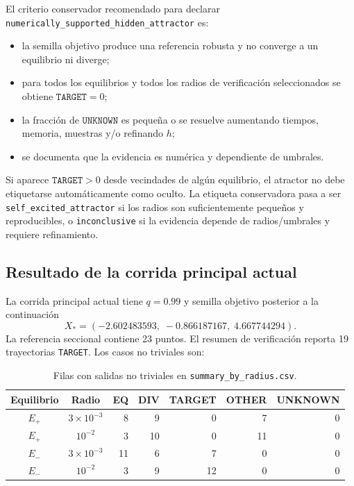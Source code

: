\documentclass[11pt]{article}
\begin{document}
El criterio conservador recomendado para declarar
\texttt{numerically\_supported\_hidden\_attractor} es:
\begin{itemize}
\item la semilla objetivo produce una referencia robusta y no converge a un
equilibrio ni diverge;
\item para todos los equilibrios y todos los radios de verificación
seleccionados se obtiene \(\texttt{TARGET}=0\);
\item la fracción de \(\texttt{UNKNOWN}\) es pequeña o se resuelve aumentando
tiempos, memoria, muestras y/o refinando \(h\);
\item se documenta que la evidencia es numérica y dependiente de umbrales.
\end{itemize}
Si aparece \(\texttt{TARGET}>0\) desde vecindades de algún equilibrio, el
atractor no debe etiquetarse automáticamente como oculto. La etiqueta
conservadora pasa a ser \texttt{self\_excited\_attractor} si los radios son
suficientemente pequeños y reproducibles, o \texttt{inconclusive} si la
evidencia depende de radios/umbrales y requiere refinamiento.

\subsection{Resultado de la corrida principal actual}

La corrida principal actual tiene \(q=0.99\) y semilla objetivo posterior a la
continuación
\[
X_\ast=(-2.602483593,\;-0.866187167,\;4.667744294).
\]
La referencia seccional contiene 23 puntos. El resumen de verificación reporta
19 trayectorias \texttt{TARGET}. Los casos no triviales son:

\begin{table}[h]
\centering
\small
\begin{tabular}{@{}c c r r r r r@{}}
\toprule
Equilibrio & Radio & EQ & DIV & TARGET & OTHER & UNKNOWN \\
\midrule
\(E_+\) & \(3\times10^{-3}\) & 8 & 9 & 0 & 7 & 0\\
\(E_+\) & \(10^{-2}\) & 3 & 10 & 0 & 11 & 0\\
\(E_-\) & \(3\times10^{-3}\) & 11 & 6 & 7 & 0 & 0\\
\(E_-\) & \(10^{-2}\) & 3 & 9 & 12 & 0 & 0\\
\bottomrule
\end{tabular}
\caption{Filas con salidas no triviales en \texttt{summary\_by\_radius.csv}.}
\end{table}
\end{document}

